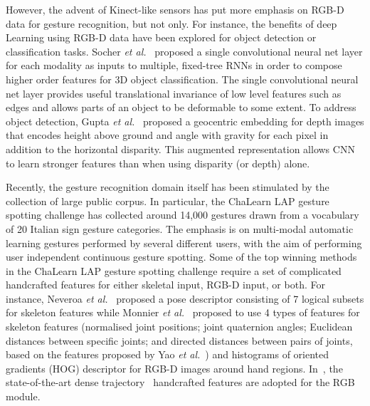 However, the advent of  Kinect-like sensors has put more emphasis on RGB-D data for gesture recognition, but not only.
For instance, the benefits of deep Learning using RGB-D data have been explored for object detection or classification tasks.
%
Socher \emph{et al.}~\cite{socher2012convolutional} proposed a single convolutional neural net layer for each modality as inputs to multiple, fixed-tree RNNs in order to compose higher order features for 3D object classification. The single convolutional neural net layer provides useful translational invariance of low level features such as edges and allows parts of an object to be deformable to some extent.
To address object detection, Gupta \emph{et al.}~\cite{gupta2014learning} proposed a geocentric embedding for depth images that encodes height above ground and angle with gravity for each pixel in addition to the horizontal disparity.
This augmented representation allows CNN to learn stronger features than when using disparity (or depth) alone.

Recently, the gesture recognition domain itself has been stimulated by the collection of large public corpus. In particular, the ChaLearn LAP \cite{chalearnLAP} gesture spotting challenge has collected around 14,000 gestures drawn from a vocabulary of 20 Italian sign gesture categories. The emphasis is on multi-modal automatic learning gestures performed by several different users, with the aim of performing user independent continuous gesture spotting.
Some of the top winning methods in the ChaLearn LAP gesture spotting challenge require a set of complicated handcrafted features for either skeletal input, RGB-D input, or both.
For instance, Neveroa \emph{et al.}~\cite{neverova2014multi} proposed a pose descriptor consisting of 7 logical subsets for skeleton features while Monnier \emph{et al.}~\cite{Monnier2014multi} proposed to use 4 types of features for skeleton features (normalised joint positions; joint quaternion angles; Euclidean distances between specific joints; and directed distances between pairs of joints, based on the features proposed by Yao \emph{et al.}~\cite{yao2011does}) and histograms of oriented gradients (HOG) descriptor for RGB-D images around hand regions.
In~\cite{Peng2014multi}, the state-of-the-art dense trajectory~\cite{wang2013dense} handcrafted features are adopted for the RGB module.

